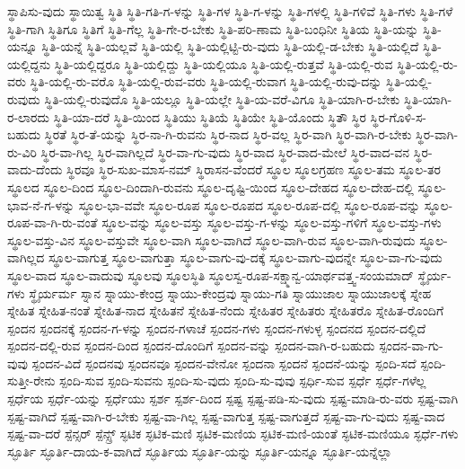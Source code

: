 {ಸ್ಥಾಪಿಸು-ವುದು
ಸ್ಥಾಯಿತ್ವ
ಸ್ಥಿತಿ
ಸ್ಥಿತಿ-ಗತಿ-ಗ-ಳನ್ನು
ಸ್ಥಿತಿ-ಗಳ
ಸ್ಥಿತಿ-ಗ-ಳನ್ನು
ಸ್ಥಿತಿ-ಗಳಲ್ಲಿ
ಸ್ಥಿತಿ-ಗಳಿವೆ
ಸ್ಥಿತಿ-ಗಳು
ಸ್ಥಿತಿ-ಗಳೆ
ಸ್ಥಿತಿ-ಗಾಗಿ
ಸ್ಥಿತಿಗೂ
ಸ್ಥಿತಿಗೆ
ಸ್ಥಿತಿ-ಗೆಲ್ಲ
ಸ್ಥಿತಿ-ಗೇ-ರ-ಬೇಕು
ಸ್ಥಿತಿ-ಪರಿ-ಣಾಮ
ಸ್ಥಿತಿ-ಬಂಧಿನೀ
ಸ್ಥಿತಿಯ
ಸ್ಥಿತಿ-ಯನ್ನು
ಸ್ಥಿತಿ-ಯನ್ನೂ
ಸ್ಥಿತಿ-ಯನ್ನೆ
ಸ್ಥಿತಿ-ಯಲ್ಲವೆ
ಸ್ಥಿತಿ-ಯಲ್ಲಿ
ಸ್ಥಿತಿ-ಯಲ್ಲಿಟ್ಟಿ-ರು-ವುದು
ಸ್ಥಿತಿ-ಯಲ್ಲಿ-ಡ-ಬೇಕು
ಸ್ಥಿತಿ-ಯಲ್ಲಿದೆ
ಸ್ಥಿತಿ-ಯಲ್ಲಿದ್ದನು
ಸ್ಥಿತಿ-ಯಲ್ಲಿದ್ದರೂ
ಸ್ಥಿತಿ-ಯಲ್ಲಿದ್ದು
ಸ್ಥಿತಿ-ಯಲ್ಲಿಯೂ
ಸ್ಥಿತಿ-ಯಲ್ಲಿ-ರುತ್ತವೆ
ಸ್ಥಿತಿ-ಯಲ್ಲಿ-ರುವ
ಸ್ಥಿತಿ-ಯಲ್ಲಿ-ರು-ವರು
ಸ್ಥಿತಿ-ಯಲ್ಲಿ-ರು-ವರೊ
ಸ್ಥಿತಿ-ಯಲ್ಲಿ-ರುವ-ವರು
ಸ್ಥಿತಿ-ಯಲ್ಲಿ-ರುವಾಗ
ಸ್ಥಿತಿ-ಯಲ್ಲಿ-ರುವು-ದನ್ನು
ಸ್ಥಿತಿ-ಯಲ್ಲಿ-ರುವುದು
ಸ್ಥಿತಿ-ಯಲ್ಲಿ-ರುವುದೊ
ಸ್ಥಿತಿ-ಯಲ್ಲೂ
ಸ್ಥಿತಿ-ಯಲ್ಲೇ
ಸ್ಥಿತಿ-ಯ-ವರೆ-ವಿಗೂ
ಸ್ಥಿತಿ-ಯಾಗಿ-ರ-ಬೇಕು
ಸ್ಥಿತಿ-ಯಾಗಿ-ರ-ಲಾರದು
ಸ್ಥಿತಿ-ಯಾ-ದರೆ
ಸ್ಥಿತಿ-ಯಿಂದ
ಸ್ಥಿತಿಯು
ಸ್ಥಿತಿಯೆ
ಸ್ಥಿತಿಯೇ
ಸ್ಥಿತಿ-ಯೊಂದು
ಸ್ಥಿತೌ
ಸ್ಥಿರ
ಸ್ಥಿರ-ಗೊಳಿ-ಸ-ಬಹುದು
ಸ್ಥಿರತೆ
ಸ್ಥಿರ-ತೆ-ಯನ್ನು
ಸ್ಥಿರ-ನಾ-ಗಿ-ರುವನು
ಸ್ಥಿರ-ನಾದ
ಸ್ಥಿರ-ವಲ್ಲ
ಸ್ಥಿರ-ವಾಗಿ
ಸ್ಥಿರ-ವಾಗಿ-ರ-ಬೇಕು
ಸ್ಥಿರ-ವಾಗಿ-ರು-ವಿರಿ
ಸ್ಥಿರ-ವಾ-ಗಿಲ್ಲ
ಸ್ಥಿರ-ವಾಗಿಲ್ಲದೆ
ಸ್ಥಿರ-ವಾ-ಗು-ವುದು
ಸ್ಥಿರ-ವಾದ
ಸ್ಥಿರ-ವಾದ-ಮೇಲೆ
ಸ್ಥಿರ-ವಾದ-ವನ
ಸ್ಥಿರ-ವಾದು-ದೆಂದು
ಸ್ಥಿರವೂ
ಸ್ಥಿರ-ಸುಖ-ಮಾಸ-ನಮ್
ಸ್ಥಿರಾಸನ-ವೆಂದರೆ
ಸ್ಥೂಲ
ಸ್ಥೂಲಗ್ರಹಣ
ಸ್ಥೂಲ-ತಮ
ಸ್ಥೂಲ-ತರ
ಸ್ಥೂಲದ
ಸ್ಥೂಲ-ದಿಂದ
ಸ್ಥೂಲ-ದಿಂದಾಗಿ-ರುವನು
ಸ್ಥೂಲ-ದೃಷ್ಟಿ-ಯಿಂದ
ಸ್ಥೂಲ-ದೇಹದ
ಸ್ಥೂಲ-ದೇಹ-ದಲ್ಲಿ
ಸ್ಥೂಲ-ಭಾವ-ನೆ-ಗ-ಳನ್ನು
ಸ್ಥೂಲ-ಭಾ-ವವೇ
ಸ್ಥೂಲ-ರೂಪ
ಸ್ಥೂಲ-ರೂಪದ
ಸ್ಥೂಲ-ರೂಪ-ದಲ್ಲಿ
ಸ್ಥೂಲ-ರೂಪ-ವನ್ನು
ಸ್ಥೂಲ-ರೂಪ-ವಾ-ಗಿ-ರು-ವಂತೆ
ಸ್ಥೂಲ-ವನ್ನು
ಸ್ಥೂಲ-ವಸ್ತು
ಸ್ಥೂಲ-ವಸ್ತು-ಗ-ಳನ್ನು
ಸ್ಥೂಲ-ವಸ್ತು-ಗಳಿಗೆ
ಸ್ಥೂಲ-ವಸ್ತು-ಗಳು
ಸ್ಥೂಲ-ವಸ್ತು-ವಿನ
ಸ್ಥೂಲ-ವಸ್ತುವೇ
ಸ್ಥೂಲ-ವಾಗಿ
ಸ್ಥೂಲ-ವಾಗಿದೆ
ಸ್ಥೂಲ-ವಾಗಿ-ರುವ
ಸ್ಥೂಲ-ವಾಗಿ-ರುವುದು
ಸ್ಥೂಲ-ವಾಗಿಲ್ಲದ
ಸ್ಥೂಲ-ವಾಗುತ್ತ
ಸ್ಥೂಲ-ವಾಗುತ್ತಾ
ಸ್ಥೂಲ-ವಾಗು-ವು-ದಕ್ಕೆ
ಸ್ಥೂಲ-ವಾಗು-ವುದನ್ನೇ
ಸ್ಥೂಲ-ವಾ-ಗು-ವುದು
ಸ್ಥೂಲ-ವಾದ
ಸ್ಥೂಲ-ವಾದುವು
ಸ್ಥೂಲವು
ಸ್ಥೂಲಸ್ಥಿತಿ
ಸ್ಥೂಲಸ್ವ-ರೂಪ-ಸಕ್ಷ್ಮಾನ್ವ-ಯಾರ್ಥವತ್ತ್ವ-ಸಂಯಮಾದ್
ಸ್ಥೈರ್ಯ-ಗಳು
ಸ್ಥೈರ್ಯರ್ಮ
ಸ್ನಾನ
ಸ್ನಾಯು-ಕೇಂದ್ರ
ಸ್ನಾಯು-ಕೇಂದ್ರವು
ಸ್ನಾಯು-ಗತಿ
ಸ್ನಾಯುಜಾಲ
ಸ್ನಾಯುಜಾಲಕ್ಕೆ
ಸ್ನೇಹ
ಸ್ನೇಹಿತ
ಸ್ನೇಹಿತ-ನಂತೆ
ಸ್ನೇಹಿತ-ನಾದ
ಸ್ನೇಹಿತನೆ
ಸ್ನೇಹಿತ-ನೆಂದು
ಸ್ನೇಹಿತರ
ಸ್ನೇಹಿತರು
ಸ್ನೇಹಿತರೊ
ಸ್ನೇಹಿತ-ರೊಂದಿಗೆ
ಸ್ಪಂದನ
ಸ್ಪಂದನಕ್ಕೆ
ಸ್ಪಂದನ-ಗ-ಳನ್ನು
ಸ್ಪಂದನ-ಗಳಾಚೆ
ಸ್ಪಂದನ-ಗಳು
ಸ್ಪಂದನ-ಗಳುಳ್ಳ
ಸ್ಪಂದನದ
ಸ್ಪಂದನ-ದಲ್ಲಿದೆ
ಸ್ಪಂದನ-ದಲ್ಲಿ-ರುವ
ಸ್ಪಂದನ-ದಿಂದ
ಸ್ಪಂದನ-ದೊಂದಿಗೆ
ಸ್ಪಂದನ-ವನ್ನು
ಸ್ಪಂದನ-ವಾಗಿ-ರ-ಬಹುದು
ಸ್ಪಂದನ-ವಾ-ಗು-ವುವು
ಸ್ಪಂದನ-ವಿದೆ
ಸ್ಪಂದನವು
ಸ್ಪಂದನವೂ
ಸ್ಪಂದನ-ವೇನೋ
ಸ್ಪಂದನಾ
ಸ್ಪಂದನೆ
ಸ್ಪಂದನೆ-ಯನ್ನು
ಸ್ಪಂದಿ-ಸದೆ
ಸ್ಪಂದಿ-ಸುತ್ತೀ-ರೇನು
ಸ್ಪಂದಿ-ಸುವ
ಸ್ಪಂದಿ-ಸುವನು
ಸ್ಪಂದಿ-ಸು-ವುದು
ಸ್ಪಂದಿ-ಸು-ವುವು
ಸ್ಪರ್ಧಿ-ಸುವ
ಸ್ಪರ್ಧೆ
ಸ್ಪರ್ಧೆ-ಗಳೆಲ್ಲ
ಸ್ಪರ್ಧೆಯ
ಸ್ಪರ್ಧೆ-ಯನ್ನು
ಸ್ಪರ್ಧೆಯು
ಸ್ಪರ್ಶ
ಸ್ಪರ್ಶ-ದಿಂದ
ಸ್ಪಷ್ಟ
ಸ್ಪಷ್ಟ-ಪಡಿ-ಸು-ವುದು
ಸ್ಪಷ್ಟ-ಮಾಡಿ-ರು-ವರು
ಸ್ಪಷ್ಟ-ವಾಗಿ
ಸ್ಪಷ್ಟ-ವಾಗಿದೆ
ಸ್ಪಷ್ಟ-ವಾಗಿ-ರ-ಬೇಕು
ಸ್ಪಷ್ಟ-ವಾ-ಗಿಲ್ಲ
ಸ್ಪಷ್ಟ-ವಾಗುತ್ತ
ಸ್ಪಷ್ಟ-ವಾಗುತ್ತದೆ
ಸ್ಪಷ್ಟ-ವಾ-ಗು-ವುದು
ಸ್ಪಷ್ಟ-ವಾದ
ಸ್ಪಷ್ಟ-ವಾ-ದರೆ
ಸ್ಪೆನ್ಸರ್
ಸ್ಪೆನ್ಸ್ರ್
ಸ್ಫಟಿಕ
ಸ್ಫಟಿಕ-ಮಣಿ
ಸ್ಫಟಿಕ-ಮಣಿಯ
ಸ್ಫಟಿಕ-ಮಣಿ-ಯಂತೆ
ಸ್ಫಟಿಕ-ಮಣಿಯೂ
ಸ್ಫರ್ಧೆ-ಗಳು
ಸ್ಫೂರ್ತಿ
ಸ್ಫೂರ್ತಿ-ದಾಯ-ಕ-ವಾಗಿದೆ
ಸ್ಫೂರ್ತಿಯ
ಸ್ಫೂರ್ತಿ-ಯನ್ನು
ಸ್ಫೂರ್ತಿ-ಯನ್ನೂ
ಸ್ಫೂರ್ತಿ-ಯನ್ನೆಲ್ಲಾ
}
